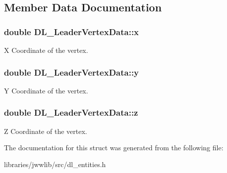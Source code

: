 \subsection{Member Data Documentation}
\hypertarget{structDL__LeaderVertexData_af845d6ab31f92b5fe67569a4149eb8ca}{
\subsubsection[{x}]{\setlength{\rightskip}{0pt plus 5cm}double D\-L\-\_\-\-Leader\-Vertex\-Data\-::x}}\label{structDL__LeaderVertexData_af845d6ab31f92b5fe67569a4149eb8ca}
X Coordinate of the vertex. \hypertarget{structDL__LeaderVertexData_ad503edab52b45c36803a2174c3631ae8}{
\subsubsection[{y}]{\setlength{\rightskip}{0pt plus 5cm}double D\-L\-\_\-\-Leader\-Vertex\-Data\-::y}}\label{structDL__LeaderVertexData_ad503edab52b45c36803a2174c3631ae8}
Y Coordinate of the vertex. \hypertarget{structDL__LeaderVertexData_a9cf4c322e1f7dd360f6202beee3666f1}{
\subsubsection[{z}]{\setlength{\rightskip}{0pt plus 5cm}double D\-L\-\_\-\-Leader\-Vertex\-Data\-::z}}\label{structDL__LeaderVertexData_a9cf4c322e1f7dd360f6202beee3666f1}
Z Coordinate of the vertex. 

The documentation for this struct was generated from the following file\-:\begin{DoxyCompactItemize}
\item 
libraries/jwwlib/src/dl\-\_\-entities.\-h\end{DoxyCompactItemize}

